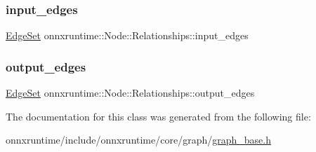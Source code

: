 \mbox{\label{classonnxruntime_1_1Node_1_1Relationships_af2b0f5c2d3c071d99cd5120a717699b8}} 
\subsubsection{\texorpdfstring{input\+\_\+edges}{input\_edges}}
{\footnotesize\ttfamily \mbox{\hyperlink{classonnxruntime_1_1Node_a96c203b69f604fcbe80532f9d939dcc6}{Edge\+Set}} onnxruntime\+::\+Node\+::\+Relationships\+::input\+\_\+edges}

\mbox{\label{classonnxruntime_1_1Node_1_1Relationships_afc504014c91de4ad25fecdd21c1d6a47}} 
\subsubsection{\texorpdfstring{output\+\_\+edges}{output\_edges}}
{\footnotesize\ttfamily \mbox{\hyperlink{classonnxruntime_1_1Node_a96c203b69f604fcbe80532f9d939dcc6}{Edge\+Set}} onnxruntime\+::\+Node\+::\+Relationships\+::output\+\_\+edges}



The documentation for this class was generated from the following file\+:\begin{DoxyCompactItemize}
\item 
onnxruntime/include/onnxruntime/core/graph/\mbox{\hyperlink{graph__base_8h}{graph\+\_\+base.\+h}}\end{DoxyCompactItemize}
